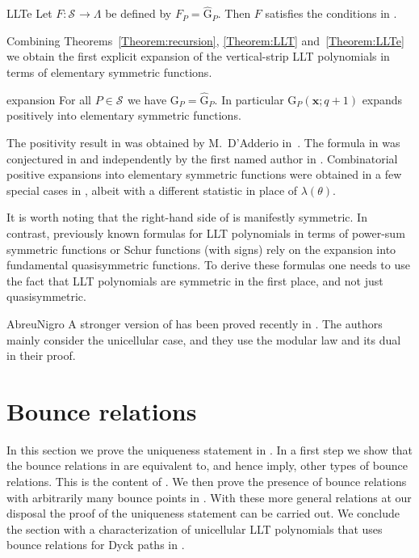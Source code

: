 \documentclass[reqno]{amsart}
\newcommand{\xvec}{\mathbf{x}}
\newcommand{\xqvar}{}%
\newcommand{\hrvpp}{{\lambda}}
\newcommand{\LLT}{\mathrm{G}}
\newcommand{\LLTe}{\hat{\mathrm{G}}} %
\newcommand{\SCH}[1]{\mathcal{S}_{#1}}     %
\begin{document}
\begin{thm}{LLTe}
Let $F:\SCH{}\to\Lambda$ be defined by $F_P\xqvar=\LLTe_P\xqvar$.
Then $F$ satisfies the conditions in .
\end{thm}

Combining Theorems~\ref{Theorem:recursion}, \ref{Theorem:LLT} and~\ref{Theorem:LLTe} we obtain the first explicit expansion of the vertical-strip LLT polynomials in terms of elementary symmetric functions.

\begin{cor}{expansion}
For all $P\in\SCH{}$ we have $\LLT_P\xqvar=\LLTe_P\xqvar$.
In particular $\LLT_P(\xvec;q+1)$ expands positively into elementary symmetric functions.
\end{cor}

The positivity result in  was obtained by M.~D'Adderio in~\cite{DAdderio2020}.
The formula in  was conjectured 
in \cite{GarsiaHaglundQiuRomero2019} and independently by the 
first named author in \cite{Alexandersson2019llt}.
Combinatorial positive expansions into elementary symmetric functions were obtained in a few special cases in \cite{AlexanderssonPanova2016,Alexandersson2019llt}, albeit with 
a different statistic in place of $\hrvpp(\theta)$.

It is worth noting that the right-hand side of  is manifestly symmetric.
In contrast, previously known formulas for LLT polynomials in terms of power-sum 
symmetric functions or Schur functions (with signs) rely on the expansion 
into fundamental quasisymmetric functions.
To derive these formulas one needs to use the fact that LLT polynomials 
are symmetric in the first place, and not just quasisymmetric.

\begin{rem}{AbreuNigro}
A stronger version of  has been proved recently in 
\cite{AbreuNigro2020bx,AbreuNigro2020ax}. The authors mainly consider
the unicellular case, and they use the modular law and its dual in their proof.
\end{rem}


\section{Bounce relations}
\label{Section:bounce}

In this section we prove the uniqueness statement in .
In a first step we show that the bounce relations in  are equivalent to, and hence imply, other types of bounce relations.
This is the content of .
We then prove the presence of bounce relations with arbitrarily many bounce points in .
With these more general relations at our disposal the proof of the uniqueness statement can be carried out.
We conclude the section with a characterization of unicellular LLT polynomials that uses bounce relations for Dyck paths in . 
\end{document}
